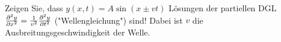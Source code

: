 \item Zeigen Sie, dass $y(x,t)=A\sin(x\pm vt)$ Lösungen der partiellen DGL $\frac{\partial^{2} y}{\partial x^{2}}=\frac{1}{v^2}\frac{\partial^{2} y}{\partial t^{2}}$ ("Wellengleichung") sind! Dabei ist $v$ die Ausbreitungsgeschwindigkeit der Welle.
